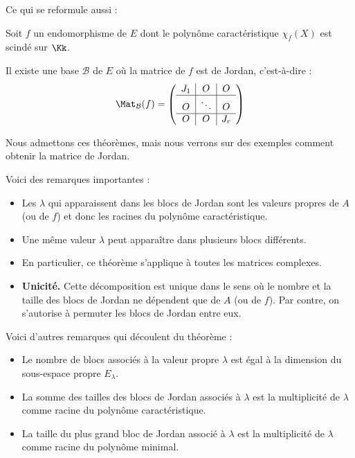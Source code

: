 \documentclass[12pt, class=report,crop=false]{standalone}
\begin{document}
Ce qui se reformule aussi :
\begin{theoreme}
Soit $f$ un endomorphisme de $E$ dont le polynôme caractéristique $\chi_f(X)$ est scindé sur $\Kk$.

Il existe une base $\mathcal{B}$ de $E$ où la matrice de $f$ est de Jordan, c'est-à-dire  :
\[ \Mat_{\mathcal{B}} (f) = 
\left(\begin{array}{c|c|c}
J_1&O&O\\\hline
O&\ddots&O\\\hline
O&O&J_r
\end{array}\right)\]
\end{theoreme}

Nous admettons ces théorèmes, mais nous verrons sur des exemples comment obtenir la matrice de Jordan.

\bigskip


Voici des remarques importantes :
\begin{itemize}
  \item Les $\lambda$ qui apparaissent dans les blocs de Jordan sont les valeurs propres de $A$ (ou de $f$) et donc les 
racines du polynôme caractéristique.

  \item Une même valeur $\lambda$ peut apparaître dans plusieurs
  blocs différents.
    
  \item En particulier, ce théorème s'applique à toutes les matrices complexes.  
  
  \item \textbf{Unicité.} Cette décomposition est unique dans le sens où le nombre et la taille des blocs de Jordan ne dépendent que de $A$ (ou de $f$). Par contre, on s'autorise à permuter les blocs de Jordan entre eux.

\end{itemize}

\bigskip

Voici d'autres remarques qui découlent du théorème :
\begin{itemize}
  \item Le nombre de blocs associés à la valeur propre $\lambda$ est égal à
  la dimension du sous-espace propre $E_\lambda$.
    
  \item La somme des tailles des blocs de Jordan associés à $\lambda$
  est la multiplicité de $\lambda$ comme racine du polynôme caractéristique.
  
  \item La taille du plus grand bloc de Jordan associé à $\lambda$ est la multiplicité de $\lambda$ comme racine du polynôme minimal.
\end{itemize}
\end{document}
